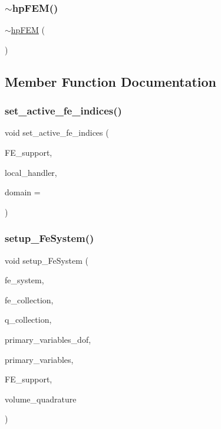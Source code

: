 \subsubsection{\texorpdfstring{$\sim$hpFEM()}{~hpFEM()}}
{\footnotesize\ttfamily $\sim$\mbox{\hyperlink{classhp_f_e_m}{hp\+F\+EM}} (\begin{DoxyParamCaption}{ }\end{DoxyParamCaption})}



\subsection{Member Function Documentation}
\mbox{\label{classhp_f_e_m_a12205240784051ad249a536cb7ee98d5}} 
\subsubsection{\texorpdfstring{set\_active\_fe\_indices()}{set\_active\_fe\_indices()}}
{\footnotesize\ttfamily void set\+\_\+active\+\_\+fe\+\_\+indices (\begin{DoxyParamCaption}\item[{std\+::vector$<$ std\+::vector$<$ int $>$ $>$ \&}]{F\+E\+\_\+support,  }\item[{hp\+::\+Do\+F\+Handler$<$ dim $>$ \&}]{local\+\_\+handler,  }\item[{int}]{domain = {} }\end{DoxyParamCaption})}

\mbox{\label{classhp_f_e_m_afe86b756fb757221f5a8a16c956b7e76}} 
\subsubsection{\texorpdfstring{setup\_FeSystem()}{setup\_FeSystem()}}
{\footnotesize\ttfamily void setup\+\_\+\+Fe\+System (\begin{DoxyParamCaption}\item[{std\+::vector$<$ std\+::shared\+\_\+ptr$<$ F\+E\+System$<$ dim $>$$>$ $>$ \&}]{fe\+\_\+system,  }\item[{hp\+::\+F\+E\+Collection$<$ dim $>$ \&}]{fe\+\_\+collection,  }\item[{hp\+::\+Q\+Collection$<$ dim $>$ \&}]{q\+\_\+collection,  }\item[{std\+::vector$<$ unsigned int $>$ \&}]{primary\+\_\+variables\+\_\+dof,  }\item[{std\+::vector$<$ std\+::vector$<$ std\+::string $>$ $>$ \&}]{primary\+\_\+variables,  }\item[{std\+::vector$<$ std\+::vector$<$ int $>$ $>$ \&}]{F\+E\+\_\+support,  }\item[{const Q\+Gauss$<$ dim $>$ \&}]{volume\+\_\+quadrature }\end{DoxyParamCaption})}


